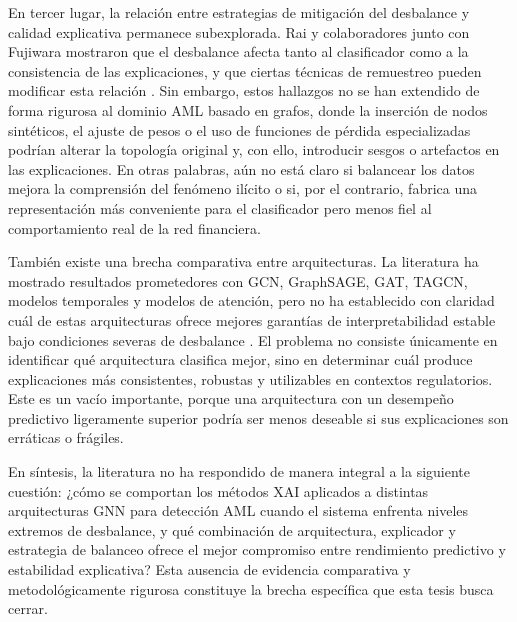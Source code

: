 \bigskip

En tercer lugar, la relación entre estrategias de mitigación del desbalance y calidad explicativa permanece subexplorada. Rai y colaboradores junto con Fujiwara mostraron que el desbalance afecta tanto al clasificador como a la consistencia de las explicaciones, y que ciertas técnicas de remuestreo pueden modificar esta relación \cite{Rai2025EvaluatingData, Fujiwara2024KnowledgeStability}. Sin embargo, estos hallazgos no se han extendido de forma rigurosa al dominio AML basado en grafos, donde la inserción de nodos sintéticos, el ajuste de pesos o el uso de funciones de pérdida especializadas podrían alterar la topología original y, con ello, introducir sesgos o artefactos en las explicaciones. En otras palabras, aún no está claro si balancear los datos mejora la comprensión del fenómeno ilícito o si, por el contrario, fabrica una representación más conveniente para el clasificador pero menos fiel al comportamiento real de la red financiera.

\bigskip

También existe una brecha comparativa entre arquitecturas. La literatura ha mostrado resultados prometedores con GCN, GraphSAGE, GAT, TAGCN, modelos temporales y modelos de atención, pero no ha establecido con claridad cuál de estas arquitecturas ofrece mejores garantías de interpretabilidad estable bajo condiciones severas de desbalance \cite{Weber2019Anti-MoneyForensics, Lin2026DetectingLaundering, Cui2024EG-SAN:Cryptocurrency, Du2017TopologyNetworks, He2026AnDetection}. El problema no consiste únicamente en identificar qué arquitectura clasifica mejor, sino en determinar cuál produce explicaciones más consistentes, robustas y utilizables en contextos regulatorios. Este es un vacío importante, porque una arquitectura con un desempeño predictivo ligeramente superior podría ser menos deseable si sus explicaciones son erráticas o frágiles.

\bigskip

En síntesis, la literatura no ha respondido de manera integral a la siguiente cuestión: ¿cómo se comportan los métodos XAI aplicados a distintas arquitecturas GNN para detección AML cuando el sistema enfrenta niveles extremos de desbalance, y qué combinación de arquitectura, explicador y estrategia de balanceo ofrece el mejor compromiso entre rendimiento predictivo y estabilidad explicativa? Esta ausencia de evidencia comparativa y metodológicamente rigurosa constituye la brecha específica que esta tesis busca cerrar.

